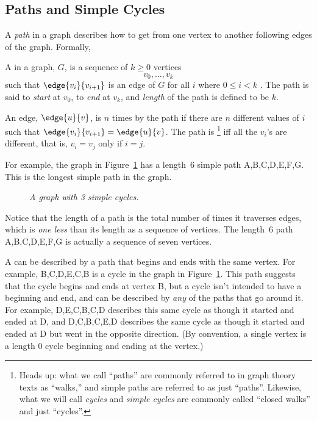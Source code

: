 \subsection{Paths and Simple Cycles}

A \emph{path} in a graph describes how to get from one vertex to another
following edges of the graph.  Formally,

\begin{definition}
A  in a graph, $G$, is a sequence of $k \geq 0$ vertices
\[
v_0,\dots,v_k
\]
such that $\edge{v_i}{v_{i+1}}$ is an edge of $G$ for all $i$ where $0
\leq i < k$ .  The path is said to \emph{start} at
$v_0$, to \emph{end} at $v_k$, and \emph{length} of the path is defined to be $k$.

An edge, $\edge{u}{v}$, is  $n$ times by the path if there
are $n$ different values of $i$ such that $\edge{v_i}{v_{i+1}} =
\edge{u}{v}$.  The path is \footnote{Heads up: what we call
  ``paths'' are commonly referred to in graph theory texts as ``walks,''
  and simple paths are referred to as just ``paths''.  Likewise, what we
  will call \emph{cycles} and \emph{simple cycles} are commonly called
  ``closed walks'' and just ``cycles''.}  iff all the $v_i$'s are
different, that is, $v_i = v_j$ only if $i=j$.
\end{definition}

For example, the graph in Figure~\ref{dg} has a length~6 simple path
A,B,C,D,E,F,G.  This is the longest simple path in the graph.
\begin{figure}[htbp] 
\caption{\em A graph with 3 simple cycles.}
\label{dg}
\end{figure}

Notice that the length of a path is the total number of times it
traverses edges, which is \emph{one less} than its length as a sequence of
vertices.  The length~6 path A,B,C,D,E,F,G is actually a sequence of seven
vertices.

A \emph{} can be described by a path that begins and ends with the same vertex.  For example,
B,C,D,E,C,B is a cycle in the graph in Figure~\ref{dg}.  This path
suggests that the cycle begins and ends at vertex B, but a cycle isn't
intended to have a beginning and end, and can be described by \emph{any}
of the paths that go around it.  For example, D,E,C,B,C,D describes this
same cycle as though it started and ended at D, and D,C,B,C,E,D describes
the same cycle as though it started and ended at D but went in the
opposite direction.  (By convention, a single vertex is a length 0 cycle
beginning and ending at the vertex.)

